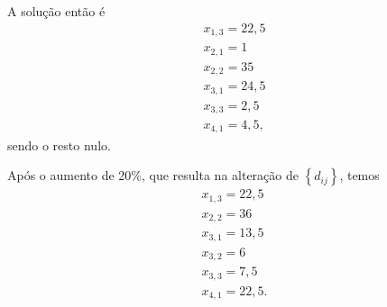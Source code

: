 \documentclass[a4paper]{report}
\begin{document}
A solução então é
\begin{align*}
    x_{1,3} = 22,5 \\
    x_{2,1} = 1 \\
    x_{2,2} = 35 \\
    x_{3,1} = 24,5 \\
    x_{3,3} = 2,5 \\
    x_{4,1} = 4,5
,\end{align*}
sendo o resto nulo.

Após o aumento de 20\%, que resulta na alteração de $\left\{ d_{ij} \right\} $, temos
\begin{align*}
    x_{1,3} = 22,5 \\
    x_{2,2} = 36 \\
    x_{3,1} = 13,5 \\
    x_{3,2} = 6 \\
    x_{3,3} = 7,5 \\
    x_{4,1} = 22,5
.\end{align*}


\end{document}
